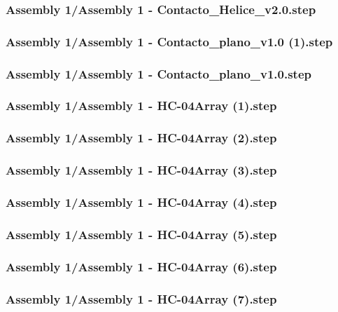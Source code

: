 \documentclass[a4paper,12pt]{article}
\begin{document}
\subsubsection{Assembly 1/Assembly 1 - Contacto_Helice_v2.0.step}

\subsubsection{Assembly 1/Assembly 1 - Contacto_plano_v1.0 (1).step}

\subsubsection{Assembly 1/Assembly 1 - Contacto_plano_v1.0.step}

\subsubsection{Assembly 1/Assembly 1 - HC-04Array (1).step}

\subsubsection{Assembly 1/Assembly 1 - HC-04Array (2).step}

\subsubsection{Assembly 1/Assembly 1 - HC-04Array (3).step}

\subsubsection{Assembly 1/Assembly 1 - HC-04Array (4).step}

\subsubsection{Assembly 1/Assembly 1 - HC-04Array (5).step}

\subsubsection{Assembly 1/Assembly 1 - HC-04Array (6).step}

\subsubsection{Assembly 1/Assembly 1 - HC-04Array (7).step}

\end{document}
